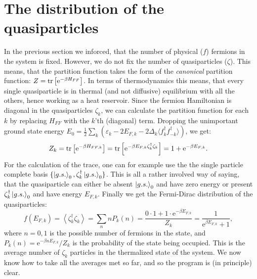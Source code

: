 \section{The distribution of the quasiparticles}
In the previous section we inforced, that the number of physical ($f$) fermions in the system is fixed. However, we do not fix the number of quasiparticles ($\zeta$). This means, that the partition function takes the form of the \textit{canonical} partition function: $Z = \operatorname{tr}\left[\text{e}^{-\beta H_{FF}}\right]$. In terms of thermodynamics this means, that every single quasiparticle is in thermal (and not diffusive) equilibrium with all the others, hence working as a heat reservoir. Since the fermion Hamiltonian is diagonal in the quasiparticles $\zeta_k$, we can calculate the partition function for each $k$ by replacing $H_{FF}$ with the $k$'th (diagonal) term. Dropping the unimportant ground state energy $E_0 = \frac{1}{2}\sum_k (\varepsilon_k-2E_{F,k}-2\Delta_k\langle f^\dagger_k f^\dagger_{-k}\rangle)$, we get:
\begin{equation}
Z_k = \operatorname{tr}\left[\text{e}^{-\beta H_{FF,k}}\right] = \operatorname{tr}\left[\text{e}^{-\beta E_{F,k}\zeta^\dagger_k\zeta_k }\right] = 1 + \text{e}^{-\beta E_{F,k}}. 
\end{equation}     
For the calculation of the trace, one can for example use the the single particle complete basis $\{\ket{g.s.}_0, \zeta^\dagger_k\ket{g.s.}_0 \}$. This is all a rather involved way of saying, that the quasiparticle can either be absent $\ket{g.s.}_0$ and have zero energy or present $\zeta^\dagger_k\ket{g.s.}_0$ and have energy $E_{F,k}$. Finally we get the Fermi-Dirac distribution of the quasiparticles:
\begin{equation}
f(E_{F,k}) = \left\langle \zeta^\dagger_k\zeta_k \right\rangle = \sum_n n P_k(n) = \frac{0\cdot 1 + 1 \cdot \text{e}^{-\beta E_{F,k}} }{Z_k} = \frac{1}{\text{e}^{\beta E_{F,k}} + 1}, 
\end{equation}
where $n=0,1$ is the possible number of fermions in the state, and $P_k(n) = \text{e}^{-\beta n E_{F,k}}/Z_k$ is the probability of the state being occupied\cite{PlischkeStatPhys,SchroederThermal}. This is the average number of $\zeta_k$ particles in the thermalized state of the system. We now know how to take all the averages met so far, and so the program is (in principle) clear.  

